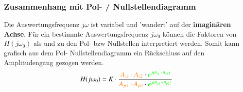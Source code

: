 \subsubsection{Zusammenhang mit Pol- / Nullstellendiagramm}

\begin{minipage}[c]{0.5\columnwidth}
    
\end{minipage}
\hfill
\begin{minipage}[c]{0.48\columnwidth}
    Die Auswertungsfrequenz $j \omega$ ist variabel und 'wandert' auf der \textbf{imaginären Achse}.
    Für ein bestimmte Auswertungsfrequenz $j \omega_0$ können die Faktoren von $H(j \omega_0)$ als 
    und  zu den Pol- bzw Nullstellen interpretiert werden.
    Somit kann grafisch aus dem Pol- Nullstellendiagramm ein Rückschluss auf den Amplitudengang gezogen werden.
    $$ H(j \omega_0) = K \cdot \frac{{\color{orange}A_{z1} \cdot A_{z2}} \cdot {\color{green}e^{j(\theta_{z1} + \theta_{z2})}}}
    {{\color{orange}A_{p1} \cdot A_{p2}} \cdot {\color{green}e^{j(\theta_{p1} + \theta_{p2})}}}  $$
\end{minipage}





